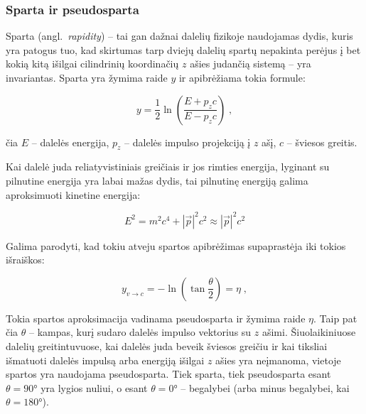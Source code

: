 \documentclass[a4paper, 12pt]{article}
\newlength\q
\begin{document}
\subsubsection*{Sparta ir pseudosparta}

Sparta (angl.\ \textit{rapidity}) -- tai gan dažnai dalelių fizikoje naudojamas dydis, kuris yra patogus tuo,
kad skirtumas tarp dviejų dalelių spartų nepakinta perėjus į bet kokią kitą išilgai cilindrinių koordinačių
$z$ ašies judančią sistemą -- yra invariantas.
Sparta yra žymima raide $y$ ir apibrėžiama tokia formule:

\begin{equation}
	y = \frac{1}{2} \ln{ \left( \frac{E+p_{z}c}{E-p_{z}c} \right) } \; \mathrm{,}
	\label{eq:rapidity}
\end{equation}

čia $E$ -- dalelės energija, $p_{z}$ -- dalelės impulso projekciją į $z$ ašį, $c$ -- šviesos greitis.

Kai dalelė juda reliatyvistiniais greičiais ir jos rimties energija, lyginant su pilnutine energija yra labai
mažas dydis, tai pilnutinę energiją galima aproksimuoti kinetine energija:

\begin{equation}
	E^2 = m^2c^4 + |\vec{p}|^2c^2 \approx |\vec{p}|^2c^2
	\label{eq:relEnergy}
\end{equation}

Galima parodyti, kad tokiu atveju spartos apibrėžimas supaprastėja iki tokios išraiškos:

\begin{equation}
	y_{v\rightarrow c} = -\ln \left( \tan \frac{\theta}{2} \right) = \eta \; \mathrm{,}
	\label{eq:pseudorapidity}
\end{equation}

Tokia spartos aproksimacija vadinama pseudosparta ir žymima raide $\eta$.
Taip pat čia $\theta$ -- kampas, kurį sudaro dalelės impulso vektorius su $z$ ašimi.
Šiuolaikiniuose dalelių greitintuvuose, kai dalelės juda beveik šviesos greičiu ir kai tiksliai
išmatuoti dalelės impulsą arba energiją išilgai $z$ ašies yra neįmanoma, vietoje spartos
yra naudojama pseudosparta.
Tiek sparta, tiek pseudosparta esant $\theta=\ang{90}$ yra lygios nuliui, o esant $\theta=\ang{0}$ --
begalybei (arba minus begalybei, kai $\theta=\ang{180}$).
\end{document}
